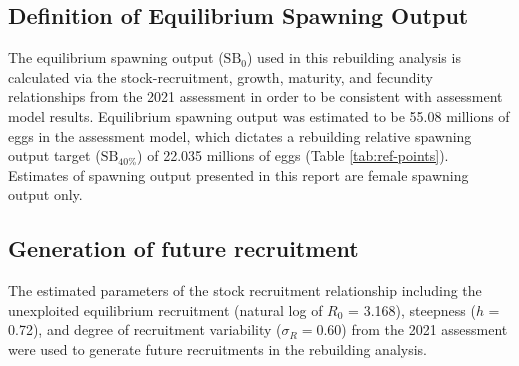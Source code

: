 \documentclass[11pt,
  english,
  letterpaper,
]{article}
\begin{document}

\hypertarget{definition-of-equilibrium-spawning-output}{%
\subsection{Definition of Equilibrium Spawning Output}\label{definition-of-equilibrium-spawning-output}}

\leavevmode\tagmcend\tagstructend


The equilibrium spawning output ({\(\text{SB}_0\)\leavevmode\tagmcend\tagstructend}) used in this rebuilding analysis is calculated via the stock-recruitment, growth, maturity, and fecundity relationships from the 2021 assessment in order to be consistent with assessment model results. Equilibrium spawning output was estimated to be 55.08 millions of eggs in the assessment model, which dictates a rebuilding relative spawning output target ({\(\text{SB}_{40\%}\)\leavevmode\tagmcend\tagstructend}) of 22.035 millions of eggs (Table \ref{tab:ref-points}). Estimates of spawning output presented in this report are female spawning output only.

\leavevmode\tagmcend\tagstructend\par


\hypertarget{generation-of-future-recruitment}{%
\subsection{Generation of future recruitment}\label{generation-of-future-recruitment}}

\leavevmode\tagmcend\tagstructend


The estimated parameters of the stock recruitment relationship including the unexploited equilibrium recruitment (natural log of {\(R_0\)\leavevmode\tagmcend\tagstructend} = 3.168), steepness ({\(h\)\leavevmode\tagmcend\tagstructend} = 0.72), and degree of recruitment variability ({\(\sigma_R = 0.60\)\leavevmode\tagmcend\tagstructend}) from the 2021 assessment were used to generate future recruitments in the rebuilding analysis.
\end{document}

